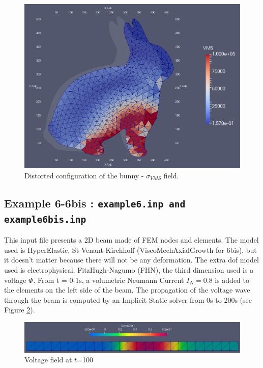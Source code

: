 \documentclass[oneside,11pt,times]{book}
\begin{document}
\begin{figure}[h!]
    \centering
    \includegraphics[scale=0.37]{imgs/Examples/ex5-VMS.png}
    \caption{Distorted configuration of the bunny  -  $\sigma_{VMS}$ field.}
    \label{ex5-VMS}
\end{figure}


\newpage
\subsection{Example 6-6bis : \texttt{example6.inp and example6bis.inp}}
This input file presents a 2D beam made of FEM nodes and elements. The model used is HyperElastic, St-Venant-Kirchhoff (ViscoMechAxialGrowth  for 6bis), but it doesn't matter because there will not be any deformation. The extra dof model used is electrophysical, FitzHugh-Nagumo (FHN), the third dimension used is a voltage $\Phi$. From t = 0-1s, a volumetric Neumann Current $I_N = 0.8$ is added to the elements on the left side of the beam. The propagation of the voltage wave through the beam is computed by an Implicit Static solver from 0s to 200s (see Figure \ref{fig:ex6t100}).

\begin{figure}[h!]
    \centering
    \includegraphics[width=1\linewidth]{imgs/Examples/ex6Beam.png}
    \caption{Voltage field at $t$=100}
    \label{fig:ex6t100}
\end{figure}
\end{document}
